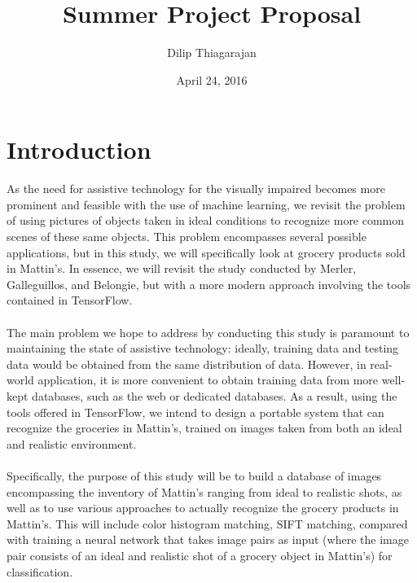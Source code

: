 \documentclass{article}
\title{Summer Project Proposal}
\author{Dilip Thiagarajan}
\date{April 24, 2016}
\begin{document}
\maketitle
\section{Introduction}
As the need for assistive technology for the visually impaired becomes more prominent and feasible with the use of machine learning, we revisit the problem of using pictures of objects taken in ideal conditions to recognize more common scenes of these same objects. This problem encompasses several possible applications, but in this study, we will specifically look at grocery products sold in Mattin's. In essence, we will revisit the study conducted by Merler, Galleguillos, and Belongie, but with a more modern approach involving the tools contained in TensorFlow. 
\\ \\
The main problem we hope to address by conducting this study is paramount to maintaining the state of assistive technology: ideally, training data and testing data would be obtained from the same distribution of data. However, in real-world application, it is more convenient to obtain training data from more well-kept databases, such as the web or dedicated databases. As a result, using the tools offered in TensorFlow, we intend to design a portable system that can recognize the groceries in Mattin's, trained on images taken from both an ideal and realistic environment.
\\ \\
Specifically, the purpose of this study will be to build a database of images encompassing the inventory of Mattin's ranging from ideal to realistic shots, as well as to use various approaches to actually recognize the grocery products in Mattin's. This will include color histogram matching, SIFT matching, compared with training a neural network that takes image pairs as input (where the image pair consists of an ideal and realistic shot of a grocery object in Mattin's) for classification.
\end{document}
